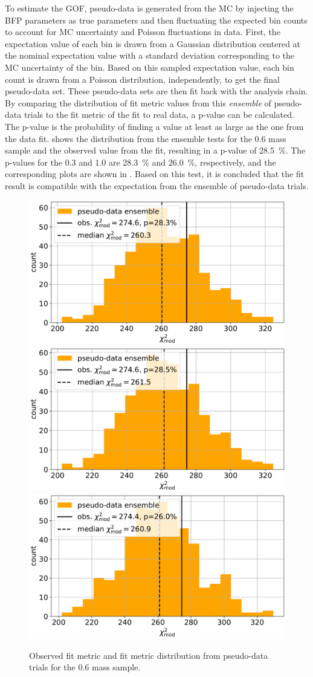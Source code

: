 To estimate the GOF, pseudo-data is generated from the MC by injecting the BFP parameters as true parameters and then fluctuating the expected bin counts to account for MC uncertainty and Poisson fluctuations in data. First, the expectation value of each bin is drawn from a Gaussian distribution centered at the nominal expectation value with a standard deviation corresponding to the MC uncertainty of the bin. Based on this sampled expectation value, each bin count is drawn from a Poisson distribution, independently, to get the final pseudo-data set. These pseudo-data sets are then fit back with the analysis chain. By comparing the distribution of fit metric values from this \textit{ensemble} of pseudo-data trials to the fit metric of the fit to real data, a p-value can be calculated. The p-value is the probability of finding a value at least as large as the one from the data fit.  shows the distribution from the ensemble tests for the \SI{0.6}{\gev} mass sample and the observed value from the fit, resulting in a p-value of \SI{28.5}{\percent}. The p-values for the \SI{0.3}{\gev} and \SI{1.0}{\gev} are \SI{28.3}{\percent} and \SI{26.0}{\percent}, respectively, and the corresponding plots are shown in . Based on this test, it is concluded that the fit result is compatible with the expectation from the ensemble of pseudo-data trials.

\begin{figure}[h]
    \includegraphics[width=0.32\linewidth]{figures/results/blind_fits/full_blind_fit_0.3_GeV_gauss_plus_poisson_step_3_4-1.png}
    \includegraphics[width=0.32\linewidth]{figures/results/blind_fits/full_blind_fit_0.6_GeV_gauss_plus_poisson_step_3_4-1.png}
    \includegraphics[width=0.32\linewidth]{figures/results/blind_fits/full_blind_fit_1.0_GeV_gauss_plus_poisson_step_3_4-1.png}
	\caption[Pseudo-data trials fit metric distribution (\SI{0.6}{\gev})]{Observed fit metric and fit metric distribution from pseudo-data trials for the \SI{0.6}{\gev} mass sample.}
\end{figure}


